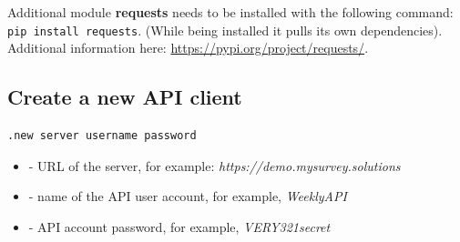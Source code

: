 Additional module \textbf{requests} needs to be installed with the following
command: \texttt{pip install requests}. (While being installed it pulls its
own dependencies). Additional information here:
\href{https://pypi.org/project/requests/}{https://pypi.org/project/requests/}.

\vskip16pt
\subsection{Create a new API client}
\begin{lstlisting}
.new server username password
\end{lstlisting}

\paramsheader
\begin{itemize}
\item {} - URL of the server, for example: \textquotedbl\textit{https://demo.mysurvey.solutions}\textquotedbl
\item {} - name of the API user account, for example, \textquotedbl\textit{WeeklyAPI}\textquotedbl
\item {} - API account password, for example, \textquotedbl\textit{VERY321secret}\textquotedbl
\end{itemize}
